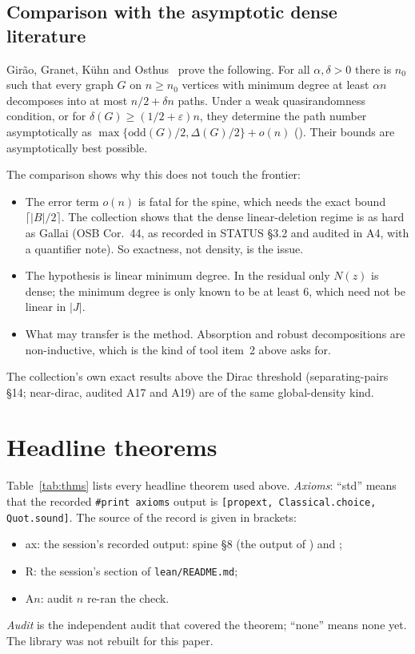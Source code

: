 \documentclass[11pt]{amsart}
\theoremstyle{definition}
\begin{document}
\subsection{Comparison with the asymptotic dense literature}\label{sec:lit}
Gir\~ao, Granet, K\"uhn and Osthus~\cite[Thm.~1.10(i)]{GGKO} prove the following. For all
$\alpha,\delta>0$ there is $n_0$ such that every graph $G$ on $n\ge n_0$ vertices with minimum degree at
least $\alpha n$ decomposes into at most $n/2+\delta n$ paths. Under a weak quasirandomness condition, or
for $\delta(G)\ge(1/2+\varepsilon)n$, they determine the path number asymptotically as
$\max\{\mathrm{odd}(G)/2,\Delta(G)/2\}+o(n)$ (\cite[Thm.~1.11, Cor.~1.12]{GGKO}). Their bounds are
asymptotically best possible.

The comparison shows why this does not touch the frontier:
\begin{itemize}[leftmargin=*]
\item The error term $o(n)$ is fatal for the spine, which needs the exact bound $\lceil|B|/2\rceil$. The
collection shows that the dense linear-deletion regime is as hard as Gallai (OSB Cor.~44, as recorded
in STATUS \S3.2 and audited in A4, with a quantifier note). So exactness, not density, is the issue.
\item The hypothesis is linear minimum degree. In the residual only $N(z)$ is dense; the minimum degree
is only known to be at least $6$, which need not be linear in $|J|$.
\item What may transfer is the method. Absorption and robust decompositions are non-inductive, which is
the kind of tool item~2 above asks for.
\end{itemize}
The collection's own exact results above the Dirac threshold (separating-pairs \S14; near-dirac,
audited A17 and A19) are of the same global-density kind.



\section{Headline theorems}\label{sec:table}

Table~\ref{tab:thms} lists every headline theorem used above. \emph{Axioms}: ``std'' means that the
recorded \texttt{\#print axioms} output is \texttt{[propext, Classical.choice, Quot.sound]}. The source of
the record is given in brackets:
\begin{itemize}[leftmargin=*]
\item ax: the session's recorded output: spine \S8 (the output of
) and ;
\item R: the session's section of \texttt{lean/README.md};
\item A$n$: audit $n$ re-ran the check.
\end{itemize}
\emph{Audit} is the independent audit that covered the theorem; ``none'' means none yet. The library was
not rebuilt for this paper.
\end{document}
